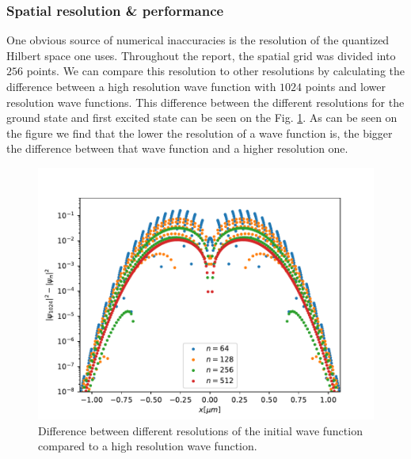 \documentclass[a4paper, twocolumn]{revtex4-1}
\begin{document}
\subsubsection{Spatial resolution \& performance}
One obvious source of numerical inaccuracies is the resolution of the quantized Hilbert space one uses. Throughout the report, the spatial grid was divided into $256$ points. We can compare this resolution to other resolutions by calculating the difference between a high resolution wave function with $1024$ points and lower resolution wave functions. This difference between the different resolutions for the ground state and first excited state can be seen on the Fig. \ref{fig:groundstateGrid}. As can be seen on the figure we find that the lower the resolution of a wave function is, the bigger the difference between that wave function and a higher resolution one. \\
\begin{figure}
	\includegraphics[width=\columnwidth]{graphics/stateAnalysis/GroundstateGrid.pdf}
	\caption{Difference between different resolutions of the initial wave function compared to a high resolution wave function.}
	\label{fig:groundstateGrid}
\end{figure}
\end{document}

